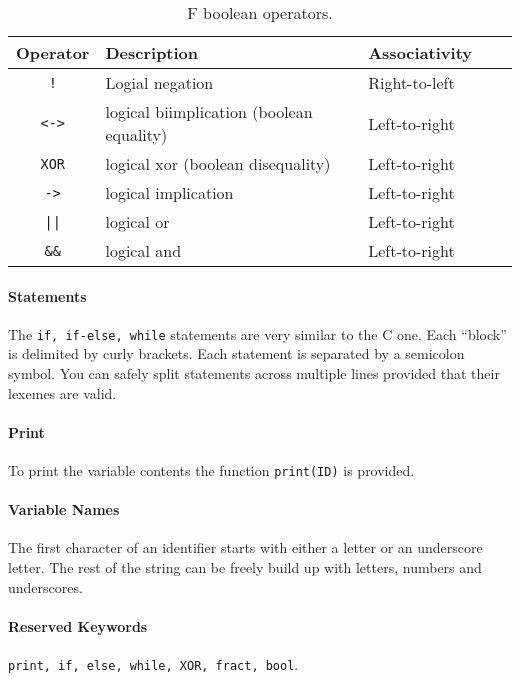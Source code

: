 \begin{table}[h]
\centering

\begin{tabular}{|c|l|l|l|l|}
\hline
\textbf{Operator} & \textbf{Description} & \textbf{Associativity} \\ 
\hline
\verb|!|	& Logial negation	& Right-to-left	\\
\verb|<->| & logical biimplication (boolean equality) & Left-to-right \\ 
\verb|XOR| & logical xor (boolean disequality) & Left-to-right \\ 
\verb|->|  & logical implication & Left-to-right \\ 
\verb!||!  & logical or & Left-to-right\\ 
\verb|&&|	& logical and & Left-to-right\\ 
\hline
\end{tabular}
\caption{F boolean operators.}
\label{table:f:bool:operators}
\end{table}

\paragraph{Statements}
The \verb|if, if-else, while| statements are very similar to the C one. Each
``block'' is delimited by curly brackets. Each statement is separated by a 
semicolon symbol. You can safely split statements across multiple lines 
provided that their lexemes are valid.

\paragraph{Print} To print the variable contents the function \verb|print(ID)|
is provided.

\paragraph{Variable Names} The first character of an identifier starts with
either a letter or an underscore letter. The rest of the string can be freely
build up with letters, numbers and underscores.

\paragraph{Reserved Keywords}
\verb|print, if, else, while, XOR, fract, bool|.



